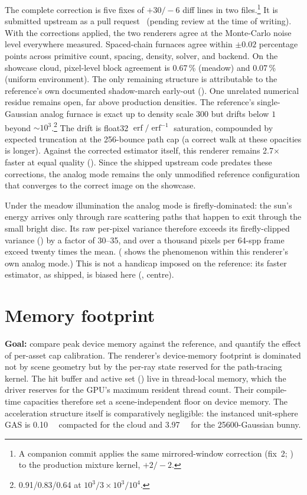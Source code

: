 The complete correction is five fixes of $+30/-6$ diff lines in two files.\footnote{A companion commit applies the same mirrored-window correction (fix~2;
) to the production mixture kernel, $+2/-2$.} It is
submitted upstream as a pull request~\cite{KramarzVolprimFixes2026} (pending review at the time of
writing). With the corrections applied, the two
renderers agree at the Monte-Carlo noise level everywhere measured. Spaced-chain furnaces agree within
$\pm\num{0.02}$ percentage points across primitive count, spacing, density, solver, and backend. On
the showcase cloud, pixel-level block agreement is \num{0.67}\,\% (meadow) and \num{0.07}\,\%
(uniform environment). The only remaining structure is attributable to the reference's own documented
shadow-march early-out (). One unrelated numerical residue remains
open, far above production densities. The reference's single-Gaussian analog furnace is exact
up to density scale \num{300} but drifts below $1$
beyond ${\sim}10^{3}$.\footnote{\num{0.91}/\num{0.83}/\num{0.64} at
$10^{3}/3{\times}10^{3}/10^{4}$.} The drift is float32
$\operatorname{erf}/\operatorname{erf}^{-1}$ saturation, compounded by expected truncation
at the \num{256}-bounce path cap (a correct walk at these opacities is longer). Against the corrected estimator itself, this renderer remains
\num{2.7}$\times$ faster at equal quality (). Since the shipped upstream code
predates these corrections, the analog mode remains the only unmodified reference configuration that
converges to the correct image on the showcase.

Under the meadow illumination the analog mode is
firefly-dominated: the sun's energy arrives only through rare scattering paths that happen to exit
through the small bright disc. Its raw per-pixel variance therefore exceeds its firefly-clipped variance () by a
factor of \num{30}--\num{35}, and over a thousand pixels per \num{64}-spp frame exceed twenty times
the mean. ( shows the phenomenon within this renderer's own analog mode.) This is not a
handicap imposed on the reference: its faster estimator, as shipped, is biased here
(, centre).

\section{Memory footprint}
\label{sec:results-memory}

\textbf{Goal:} compare peak device memory against the reference, and quantify the effect
of per-asset cap calibration. The renderer's device-memory footprint is dominated not by scene geometry but by the per-ray state
reserved for the path-tracing kernel. The hit buffer and active set () live in
thread-local memory, which the driver reserves for the GPU's maximum resident thread count. Their
compile-time capacities therefore set a scene-independent floor on device memory. The
acceleration structure itself is comparatively negligible: the instanced unit-sphere GAS is
\SI{0.10}{\mega\byte} compacted for the cloud and \SI{3.97}{\mega\byte} for the \num{25600}-Gaussian
bunny.

